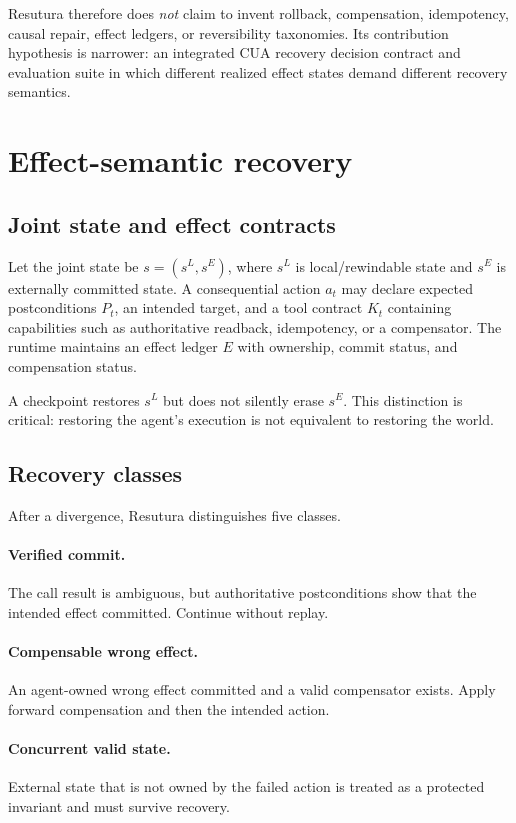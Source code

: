 \documentclass{article}
\begin{document}
Resutura therefore does \emph{not} claim to invent rollback, compensation, idempotency, causal repair, effect ledgers, or reversibility taxonomies. Its contribution hypothesis is narrower: an integrated CUA recovery decision contract and evaluation suite in which different realized effect states demand different recovery semantics.

\section{Effect-semantic recovery}
\subsection{Joint state and effect contracts}
Let the joint state be $s=(s^L,s^E)$, where $s^L$ is local/rewindable state and $s^E$ is externally committed state. A consequential action $a_t$ may declare expected postconditions $P_t$, an intended target, and a tool contract $K_t$ containing capabilities such as authoritative readback, idempotency, or a compensator. The runtime maintains an effect ledger $E$ with ownership, commit status, and compensation status.

A checkpoint restores $s^L$ but does not silently erase $s^E$. This distinction is critical: restoring the agent's execution is not equivalent to restoring the world.

\subsection{Recovery classes}
After a divergence, Resutura distinguishes five classes.

\paragraph{Verified commit.} The call result is ambiguous, but authoritative postconditions show that the intended effect committed. Continue without replay.

\paragraph{Compensable wrong effect.} An agent-owned wrong effect committed and a valid compensator exists. Apply forward compensation and then the intended action.

\paragraph{Concurrent valid state.} External state that is not owned by the failed action is treated as a protected invariant and must survive recovery.
\end{document}

